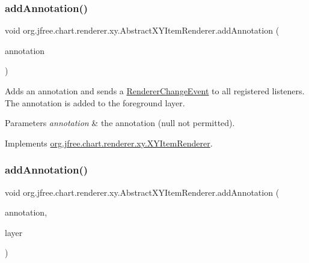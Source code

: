 \subsubsection{\texorpdfstring{add\+Annotation()}{addAnnotation()}\hspace{0.1cm}{\footnotesize\ttfamily [1/2]}}
{\footnotesize\ttfamily void org.\+jfree.\+chart.\+renderer.\+xy.\+Abstract\+X\+Y\+Item\+Renderer.\+add\+Annotation (\begin{DoxyParamCaption}\item[{\mbox{\hyperlink{interfaceorg_1_1jfree_1_1chart_1_1annotations_1_1_x_y_annotation}{X\+Y\+Annotation}}}]{annotation }\end{DoxyParamCaption})}

Adds an annotation and sends a \mbox{\hyperlink{}{Renderer\+Change\+Event}} to all registered listeners. The annotation is added to the foreground layer.


\begin{DoxyParams}{Parameters}
{\em annotation} & the annotation ({\ttfamily null} not permitted). \\
\hline
\end{DoxyParams}


Implements \mbox{\hyperlink{interfaceorg_1_1jfree_1_1chart_1_1renderer_1_1xy_1_1_x_y_item_renderer_a77ae0c811fd22ffd2f808332deadfcbd}{org.\+jfree.\+chart.\+renderer.\+xy.\+X\+Y\+Item\+Renderer}}.

\mbox{\label{classorg_1_1jfree_1_1chart_1_1renderer_1_1xy_1_1_abstract_x_y_item_renderer_a497fe9e13ccf4fdeefc262af5a1cf8ff}} 
\subsubsection{\texorpdfstring{add\+Annotation()}{addAnnotation()}\hspace{0.1cm}{\footnotesize\ttfamily [2/2]}}
{\footnotesize\ttfamily void org.\+jfree.\+chart.\+renderer.\+xy.\+Abstract\+X\+Y\+Item\+Renderer.\+add\+Annotation (\begin{DoxyParamCaption}\item[{\mbox{\hyperlink{interfaceorg_1_1jfree_1_1chart_1_1annotations_1_1_x_y_annotation}{X\+Y\+Annotation}}}]{annotation,  }\item[{Layer}]{layer }\end{DoxyParamCaption})}

